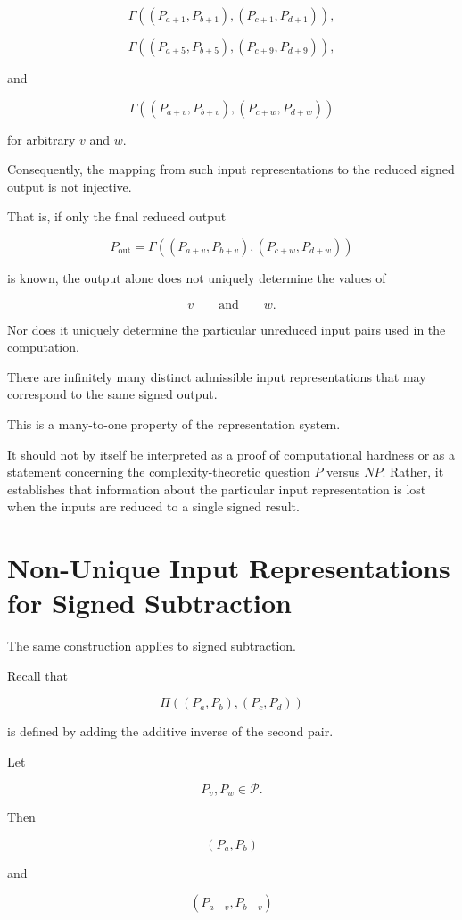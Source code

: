 \documentclass[12pt]{article}
\begin{document}
\[
\Gamma
\left(
(P_{a+1},P_{b+1}),
(P_{c+1},P_{d+1})
\right),
\]

\[
\Gamma
\left(
(P_{a+5},P_{b+5}),
(P_{c+9},P_{d+9})
\right),
\]

and

\[
\Gamma
\left(
(P_{a+v},P_{b+v}),
(P_{c+w},P_{d+w})
\right)
\]

for arbitrary \(v\) and \(w\).

Consequently, the mapping from such input representations to the reduced signed output is not injective.

That is, if only the final reduced output

\[
P_{\mathrm{out}}
=
\Gamma
\left(
(P_{a+v},P_{b+v}),
(P_{c+w},P_{d+w})
\right)
\]

is known, the output alone does not uniquely determine the values of

\[
v
\qquad\text{and}\qquad
w.
\]

Nor does it uniquely determine the particular unreduced input pairs used in the computation.

There are infinitely many distinct admissible input representations that may correspond to the same signed output.

This is a many-to-one property of the representation system.

It should not by itself be interpreted as a proof of computational hardness or as a statement concerning the complexity-theoretic question \(P\) versus \(NP\). Rather, it establishes that information about the particular input representation is lost when the inputs are reduced to a single signed result.

\section*{Non-Unique Input Representations for Signed Subtraction}

The same construction applies to signed subtraction.

Recall that

\[
\Pi
\left(
(P_a,P_b),(P_c,P_d)
\right)
\]

is defined by adding the additive inverse of the second pair.

Let

\[
P_v,P_w\in\mathcal P.
\]

Then

\[
(P_a,P_b)
\]

and

\[
(P_{a+v},P_{b+v})
\]
\end{document}
